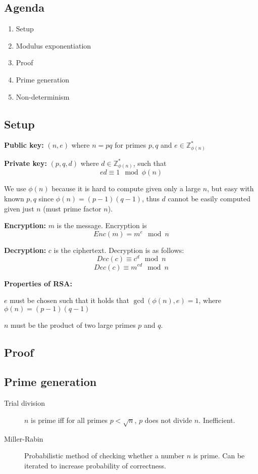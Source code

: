 

\subsection*{Agenda}
\begin{enumerate}
\item Setup
\item Modulus exponentiation
\item Proof
\item Prime generation
\item Non-determinism
\end{enumerate}

\subsection{Setup}
\textbf{Public key:} $(n, e)$ where $n = pq$ for primes $p, q$ and $e \in \mathbb{Z}_{\phi(n)}^*$

\textbf{Private key:} $(p, q, d)$ where $d \in \mathbb{Z}_{\phi(n)}^*$, such that
\[ ed \equiv 1 \mod \phi(n) \]

We use $\phi(n)$ because it is hard to compute given only a large $n$, but easy with known $p, q$ since $\phi(n) = (p-1)(q-1)$, thus $d$ cannot be easily computed given just $n$ (must prime factor $n$).

\textbf{Encryption:} $m$ is the message. Encryption is
\[ Enc(m) = m^e \mod n \]

\textbf{Decryption:} $c$ is the ciphertext. Decryption is as follows:
\[ Dec(c) \equiv c^d \mod n \]
\[ Dec(c) \equiv m^{ed} \mod n \]

\textbf{Properties of RSA:}

$e$ must be chosen such that it holds that $\gcd(\phi(n),e) = 1$, where
$\phi(n) = (p - 1)(q - 1)$

$n$ must be the product of two large primes $p$ and $q$.

\subsection{Proof}


\subsection{Prime generation}
\begin{description}
\item[Trial division] $n$ is prime iff for all primes $p < \sqrt{n}$,
  $p$ does not divide $n$. Inefficient.
\item[Miller-Rabin] Probabilistic method of checking whether a number
  $n$ is prime. Can be iterated to increase probability of correctness.
\end{description}

